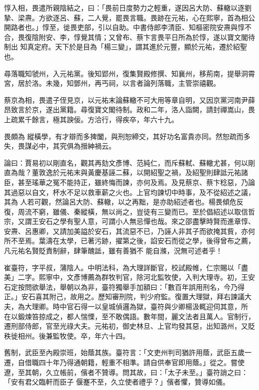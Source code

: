 \begin{pinyinscope}
 惇入相，畏遣所親陰結之，曰：「畏前日度勢力之輕重，遂因呂大防、蘇轍以逐劉摯、梁燾。方欲逐呂、蘇，二人覺，罷畏言職。畏跡在元祐，心在熙寧，首為相公開路者也。」惇至，徙畏吏部，引以自助。中書侍郎李清臣、知樞密院安燾與惇不合，畏復陰附安、李，惇覺其情；又曾布、蔡卞言畏平日所為於惇，遂以寶文閣待制出
 知真定府。天下於是目為「楊三變」，謂其進於元豐，顯於元祐，遷於紹聖也。



 尋落職知虢州，入元祐黨。後知郢州，復集賢殿修撰、知襄州，移荊南，提舉洞霄宮，居於洛。未幾，知鄧州，再丐祠，以言者論列落職，主管崇禧觀。



 蔡京為相，畏遣子侄見京，以元祐末論蘇轍不可大用等章自明，又因京黨河南尹薛昂致言於京，遂出黨籍。尋復寶文閣待制。政和二年，洛人詣闕，請封禪嵩山，畏上疏累千餘言，極其諛佞。方洽行，得疾卒，年六十九。



 畏頗為
 縱橫學，有才辯而多捭闔，與刑恕締交，其好功名富貴亦同。然恕疏而多失，畏謀必中，其究俱為搢紳禍云。



 論曰：賈易初以剛直名，觀其再劾文彥博、范純仁，而斥蘇軾、蘇轍尤甚，何以剛直為哉？董敦逸於元祐末與黃慶基誣二蘇，以開紹聖之禍，及紹聖則肆詆元祐諸臣，甚至瑤華之冤不能持正，雖終悔而諫，亦何及焉。及見蔡京、蔡卞稔惡，乃論其過惡以自文，杯水不足以救車薪之火也。上官均諫切中時事，及不從紹述之議，其為
 人若可觀，然論呂大防、蘇轍，以之再黜，是亦助紹述者也。楊畏傾危反復，周流不窮，雖儀、秦縱橫，無以尚之，豈徒有三變而已。至於倡紹述以取信哲宗，又謂王安石之學有聖人意，可謂小人無忌憚也哉。來之邵盡擊時賢而進章惇、安燾、呂惠卿，又請加美謚於安石，其流惡不已，乃誣人非其子而欲掩其貲，亦何所不至焉。葉濤在太學，已著污跡，擢第之後，諂安石而從之學，後得曾布之薦，凡元祐名賢貶責制辭，肆筆醜詆，雖有善猶不
 能自滌，況無可述者乎！



 崔臺符，字平叔，蒲陰人。中明法科，為大理詳斷官，校試殿帷，仁宗賜以「盡美」二字。熙寧中，文彥博薦為群牧判官，除河北監牧使，入判大理寺。初，王安石定按問欲舉法，舉朝以為非，臺符獨舉手加額曰：「數百年誤用刑名，今乃得正。」安石喜其附己，故用之。歷知審刑院，判少府監。復置大理獄，拜右諫議大夫，為大理卿。時中官石得一以皇城偵邏為獄，臺符與少卿楊汲輒迎伺其意，所
 在以鍛煉笞掠成之，都人惴慄，至不敢偶語。數年間，麗文法者且萬人。官制行，遷刑部侍郎，官至光祿大夫。元祐初，御史林旦、上官均發其惡，出知潞州，又貶秩徙相州。後兼監牧使。卒，年六十四。



 舊制，武臣至內殿崇班，始蔭其族。臺符言：「文吏州判司猶許用蔭，武臣五歲一遷，自借職四十年乃得通朝籍，輕重不相準。請自供奉官即用蔭。」從之。嘗使遼，至其朝，久立帳前，儐者不贊導。問其故，曰：「太子未至。」臺符誚之曰：「安有君父臨軒而臣子
 偃蹇不至，久立使者禮乎？」儐者懼，贊導如儀。




\end{pinyinscope}
